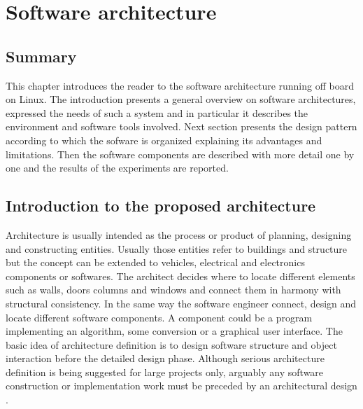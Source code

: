 
\chapter{Software architecture}
\label{chap:sixth
}
\ifpdf
    \graphicspath{{Chapter6/Figures/PNG/}{Chapter6/Figures/PDF/}{Chapter6/Figures/}}
\else
    \graphicspath{{Chapter6/Figures/EPS/}{Chapter6/Figures/}}
\fi

\section*{Summary}

This chapter introduces the reader to the software architecture running off board on Linux. The introduction presents a  general overview on software architectures, expressed the needs of such a system and in particular it describes the environment and software tools involved. Next section presents the design pattern according to which the sofware is organized explaining its advantages and limitations. Then the software components are described with more detail one by one and the results of the experiments are reported. 
\section{Introduction to the proposed architecture}

Architecture is usually intended as the process or product of planning, designing and constructing entities. Usually those entities refer to buildings and structure but the concept can be extended to vehicles, electrical and electronics components or softwares. The architect decides where to locate different elements such as walls, doors columns and windows and connect them in harmony with structural consistency. In the same way the software engineer connect, design and locate different software components. A component could be a program implementing an algorithm, some conversion or a graphical user interface. The basic idea of architecture definition is to design software structure and object interaction before the detailed design phase. Although serious architecture definition is being suggested for large projects only, arguably any software construction or implementation work must be preceded by an architectural design \cite{msdn}.
